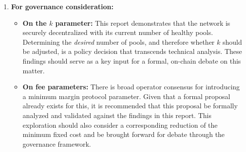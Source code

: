 \documentclass[11pt, letterpaper]{article}
\begin{document}
\begin{enumerate}
	\item \textbf{For governance consideration:}
	      \begin{itemize}
		      \item \textbf{On the $k$ parameter:} This report demonstrates that the network is securely decentralized
		            with its current number of healthy pools. Determining the \textit{desired} number of pools, and therefore
		            whether $k$ should be adjusted, is a policy decision that transcends technical analysis. These findings
		            should serve as a key input for a formal, on-chain debate on this matter.
		      \item \textbf{On fee parameters:} There is broad operator consensus for introducing a minimum margin
		            protocol parameter. Given that a formal proposal already exists for this, it is recommended that this
		            proposal be formally analyzed and validated against the findings in this report. This exploration should
		            also consider a corresponding reduction of the minimum fixed cost and be brought forward for debate
		            through the governance framework.
	      \end{itemize}


\end{enumerate}
\end{document}
